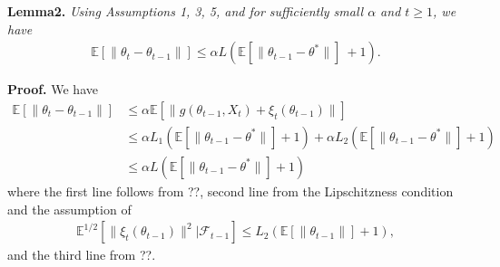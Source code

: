 \documentclass[a4paper]{article}
\newcommand{\norm}[1]{\|#1 \|}
\newcommand{\Exs}{\mathbb{E}}
\newcommand{\thetastar}{\theta^*}
\newcommand{\stepsize}{\alpha}
\begin{document}
	\textbf{Lemma2.} \textit{Using Assumptions 1, 3, 5, and for sufficiently small $\stepsize$ and $t \ge 1$, we have
	\begin{align*}
		\Exs\left[\norm{\theta_{t} - \theta_{t - 1}}\right] \leq \stepsize L\left(\Exs\left[\norm{\theta_{t - 1} - \thetastar}\right]\ + 1\right).
	\end{align*}
	}
	
	\textbf{Proof.} We have
	\begin{align*}
		\Exs\left[\norm{\theta_{t} - \theta_{t - 1}}\right] &\leq \stepsize\Exs\left[\norm{g\left(\theta_{t - 1}, X_{t}\right) + \xi_{t}\left(\theta_{t - 1}\right)}\right]\\
		& \leq \stepsize L_{1}\left(\Exs\left[\norm{\theta_{t - 1} - \thetastar}\right] + 1\right) + \stepsize L_{2}\left(\Exs\left[\norm{\theta_{t - 1} - \thetastar}\right] + 1\right)\\
		& \leq \stepsize L\left(\Exs\left[\norm{\theta_{t - 1} - \thetastar}\right] + 1\right)
	\end{align*}
	where the first line follows from ??, second line from the Lipschitzness condition and the assumption of
	\begin{align*}
		\Exs^{1 / 2 }\left[\norm{\xi_{t}\left(\theta_{t - 1}\right)}^{2} | \mathcal{F}_{t - 1}\right] \leq L_{2}\left(\Exs\left[\norm{\theta_{t - 1}}\right] + 1\right),
	\end{align*}
	 and the third line from ??.\\
	
\end{document}
